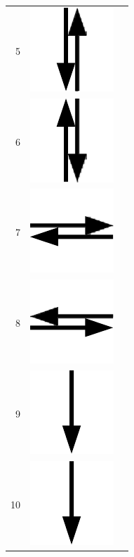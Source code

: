 \documentclass[11pt,a4paper,notitlepage]{article}
\begin{document}
\begin{center}
\begin{supertabular}{rcl}
  5 & \includegraphics[scale=0.25]{img/up-down} & \\
  6 & \includegraphics[scale=0.25]{img/down-up} & \\
  7 & \includegraphics[scale=0.25]{img/left-right} & \\
  8 & \includegraphics[scale=0.25]{img/right-left} & \\
  9 & \includegraphics[scale=0.25]{img/down} & \\
 10 & \includegraphics[scale=0.25]{img/down} & \\
\end{supertabular}
\end{center}
\end{document}

